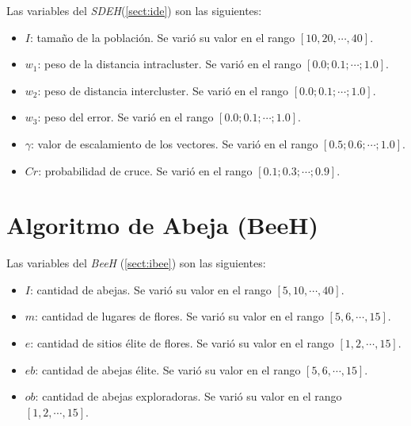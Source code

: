         Las variables del \emph{SDEH}(\ref{sect:ide}) son las siguientes:
        \begin{itemize}
            \item $I$: tamaño de la población. Se varió su valor en el rango
        $[10, 20, \cdots, 40]$.
            \item $w_1$: peso de la distancia intracluster. Se varió en el rango
        $[0.0; 0.1; \cdots; 1.0]$.
            \item $w_2$: peso de distancia intercluster. Se varió en el rango
        $[0.0; 0.1; \cdots; 1.0]$.
            \item $w_3$: peso del error. Se varió en el rango
        $[0.0; 0.1; \cdots; 1.0]$.
	        \item $\gamma$: valor de escalamiento de los vectores. Se varió en el rango
        $[0.5; 0.6; \cdots; 1.0]$.
	        \item $Cr$: probabilidad de cruce. Se varió en el rango
        $[0.1; 0.3; \cdots; 0.9]$.
        \end{itemize}

        
        
        \begin{landscape}
        
        
        
        \end{landscape}

        
        
        

\section{Algoritmo de Abeja (BeeH)}\label{sect:abee}

    Las variables del \emph{BeeH} (\ref{sect:ibee}) son las siguientes:
    \begin{itemize}
        \item $I$: cantidad de abejas. Se varió su valor en el rango
    $[5, 10, \cdots, 40]$.
        \item $m$: cantidad de lugares de flores. Se varió su valor en el rango
    $[5, 6, \cdots, 15]$.
        \item $e$: cantidad de sitios élite de flores. Se varió su valor en el rango
    $[1, 2, \cdots, 15]$.
        \item $eb$: cantidad de abejas élite. Se varió su valor en el rango
    $[5, 6, \cdots, 15]$.
	    \item $ob$: cantidad de abejas exploradoras. Se varió su valor en el rango
    $[1, 2, \cdots, 15]$.
    \end{itemize}

